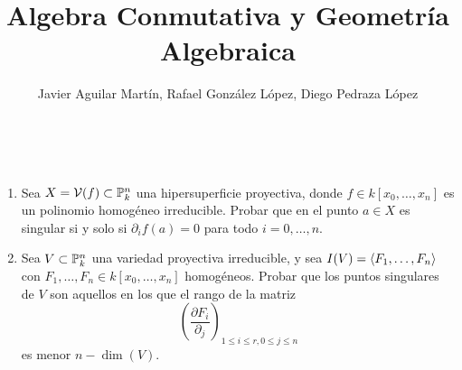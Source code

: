 \documentclass[twoside]{article}
\begin{document}
\title{Algebra Conmutativa y Geometría Algebraica}
\author{Javier Aguilar Martín, Rafael González López, Diego Pedraza López}
\maketitle

\begin{ejercicio}{4}\
 
\begin{enumerate}
\item Sea $X = \mathcal{V}(f)\subset \mathbb{P}^n_k$ una hipersuperficie proyectiva, donde $f\in k[x_0,\dotsc,x_n]$ es un polinomio homogéneo irreducible. Probar que en el punto $a\in X$ es singular si y solo si $\partial_i f(a) = 0$ para todo $i=0,\dotsc,n$. 
\item Sea $V\subset \mathbb{P}^n_k$ una variedad proyectiva irreducible, y sea $I(V )= \langle{F_1,\dotsc,F_n}\rangle$ con $F_1,\dotsc,F_n \in k[x_0,\dotsc,x_n]$ homogéneos. Probar que los puntos singulares de $V$ son aquellos en los que el rango de la matriz 
$$
\left(
\frac{\partial F_i}{\partial_j}\right)_{1\leq i \leq r, 0\leq j \leq n}
$$
es menor $n-\dim(V)$.
\end{enumerate}
\end{ejercicio}
\end{document}
